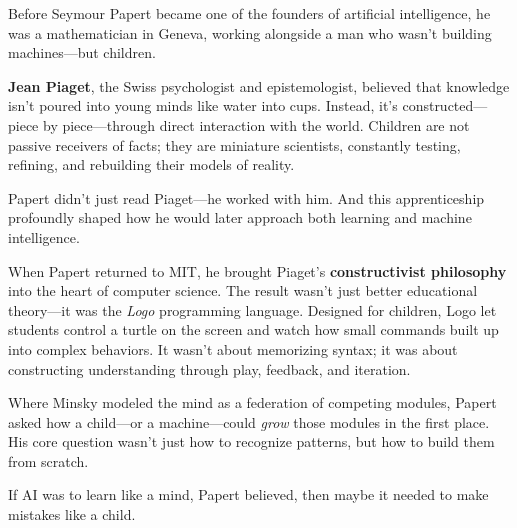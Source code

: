\begin{tcolorbox}[sidebarstyle, title={Jean Piaget and Papert's Constructivist Turn}]
  Before Seymour Papert became one of the founders of artificial intelligence, he was a mathematician in Geneva, working alongside a man who wasn't building machines—but children.
  
  \textbf{Jean Piaget}, the Swiss psychologist and epistemologist, believed that knowledge isn’t poured into young minds like water into cups. Instead, it’s constructed—piece by piece—through direct interaction with the world. Children are not passive receivers of facts; they are miniature scientists, constantly testing, refining, and rebuilding their models of reality.
  
  Papert didn’t just read Piaget—he worked with him. And this apprenticeship profoundly shaped how he would later approach both learning and machine intelligence.
  
  When Papert returned to MIT, he brought Piaget’s \textbf{constructivist philosophy} into the heart of computer science. The result wasn’t just better educational theory—it was the \emph{Logo} programming language. Designed for children, Logo let students control a turtle on the screen and watch how small commands built up into complex behaviors. It wasn’t about memorizing syntax; it was about constructing understanding through play, feedback, and iteration.
  
  Where Minsky modeled the mind as a federation of competing modules, Papert asked how a child—or a machine—could \emph{grow} those modules in the first place. His core question wasn’t just how to recognize patterns, but how to build them from scratch.
  
  \medskip
  If AI was to learn like a mind, Papert believed, then maybe it needed to make mistakes like a child.
\end{tcolorbox}
